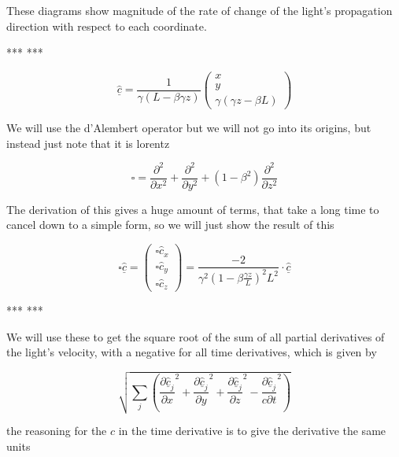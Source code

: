 These diagrams show magnitude of the rate of change of the light's propagation direction with respect to each coordinate.

***
***

\begin{equation}
	\underline{\hat{c}} = \frac{1}{ \gamma \left( L - \beta \gamma z \right) }
		\begin{pmatrix}
			x \\
			y \\
			\gamma \left(\gamma z - \beta L \right)
		\end{pmatrix}
\end{equation}

We will use the d'Alembert operator but we will not go into its origins, but instead just note that it is lorentz



\begin{equation}
	 \square =  \frac{\partial^2}{\partial x^2} + \frac{\partial^2}{\partial y^2} + (1-\beta^2) \frac{\partial^2}{\partial z^2}
\end{equation}

The derivation of this gives a huge amount of terms, that take a long time to cancel down to a simple form, so we will just show the result of this

\begin{equation}
	  \square \underline{\hat{c}} =
	  \begin{pmatrix}
		\square \hat{c}_x \\
		\square \hat{c}_y \\
		\square \hat{c}_z
	  \end{pmatrix}
	  =
	  \frac{-2}{\gamma^2\left( 1 - \beta \frac{\gamma z}{L} \right)^2L^2} \cdot \underline{\hat{c}}
\end{equation}

***
***


We will use these to get the square root of the sum of all partial derivatives of the light's velocity, with a negative for all time derivatives, which is given by

\begin{equation}
	\sqrt{\sum_{j} \left( \frac{\partial \underline{\hat{c}}_j}{\partial x}^2 + \frac{\partial \underline{\hat{c}}_j}{\partial y}^2 + \frac{\partial \underline{\hat{c}}_j}{\partial z}^2 - \frac{\partial \underline{\hat{c}}_j}{c\partial t}^2 \right) }
\end{equation}

the reasoning for the $c$ in the time derivative is to give the derivative the same units



